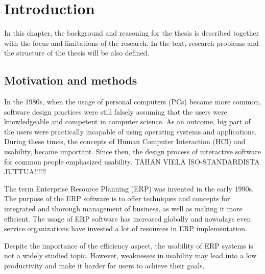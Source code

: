 \documentclass[12pt,a4paper,oneside,pdftex]{report}
\begin{document}

% 

\chapter{Introduction}
\label{chapter:introduction}
In this chapter, the background and reasoning for the thesis is described together with the focus and limitations of the research. In the text, research problems and the structure of the thesis will be also defined. 

\section{Motivation and methods}
\label{sec:motivationandmethods}
In the 1980s, when the usage of personal computers (PCs) became more common, software design practices were still falsely assuming that the users were knowledgeable and competent in computer science. As an outcome, big part of the users were practically incapable of using operating systems and applications.
During these times, the concepts of Human Computer Interaction (HCI) and usability, became important. Since then, the design process of interactive software for common people emphasized usability. \cite{RefWorks:9} TÄHÄN VIELÄ ISO-STANDARDISTA JUTTUA!!!!!!

The term Enterprise Resource Planning (ERP) was invented in the early 1990s.\cite{RefWorks:3} The purpose of the ERP software is to offer techniques and concepts for integrated and thorough management of business, as well as making it more efficient.
The usage of ERP software has increased globally and nowadays even service organizations have invested a lot of resources in ERP implementation.\cite{RefWorks:1, RefWorks:7} 

Despite the importance of the efficiency aspect, the usability of ERP systems is not a widely studied topic. However, weaknesses in usability may lead into a low productivity and make it harder for users to achieve their goals.\cite{RefWorks:2} 
\end{document}
